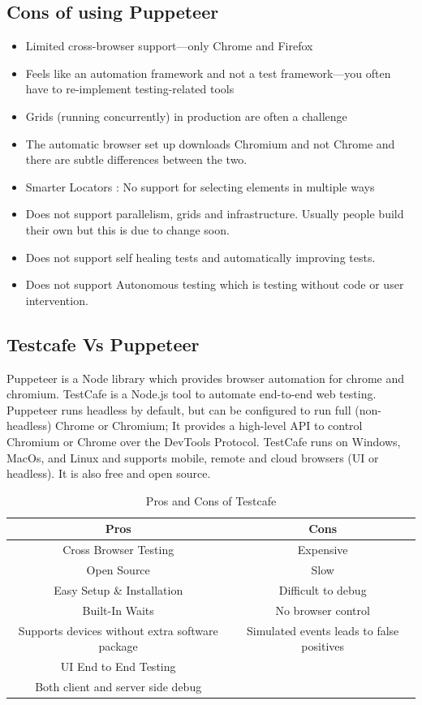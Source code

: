 \documentclass[12pt,a4paper,titlepage]{report}
\begin{document}
\subsection{Cons of using Puppeteer}
\begin{itemize}
 \item Limited cross-browser support—only Chrome and Firefox
 \item Feels like an automation framework and not a test framework—you often have to re-implement testing-related tools
 \item Grids (running concurrently) in production are often a challenge
 \item The automatic browser set up downloads Chromium and not Chrome and there are subtle differences between the two.
 \item Smarter Locators : No support for selecting elements in multiple ways
 \item Does not support parallelism, grids and infrastructure. Usually people build their own but this is due to change soon.
 \item Does not support self healing tests and automatically improving tests.
 \item Does not support Autonomous testing which is testing without code or user intervention.
\end{itemize}

\subsection{Testcafe Vs Puppeteer}

Puppeteer is a Node library which provides browser automation for chrome and chromium.
TestCafe is a Node.js tool to automate end-to-end web testing. Puppeteer runs headless by default,
but can be configured to run full (non-headless) Chrome or Chromium; It provides a high-level API to
control Chromium or Chrome over the DevTools Protocol. TestCafe runs on Windows, MacOs, and Linux and
supports mobile, remote and cloud browsers (UI or headless). It is also free and open source.

\begin{table}[H]
  \centering
  \small
  \setlength\tabcolsep{6pt}
  \begin{tabular}{|c|c|}
   \hline \textbf
   {Pros} & \textbf {Cons}\\
   \hline\hline
   Cross Browser Testing&Expensive\\
   \hline
   Open Source& Slow\\
   \hline
   Easy Setup \& Installation& Difficult to debug\\
   \hline
   Built-In Waits& No browser control\\
   \hline
   Supports devices without extra software package & Simulated events leads to false positives\\
   \hline
   UI End to End Testing\\
   \hline
   Both client and server side debug \\
   \hline
  \end{tabular}
  \caption{Pros and Cons of Testcafe}
 \end{table}
\end{document}
